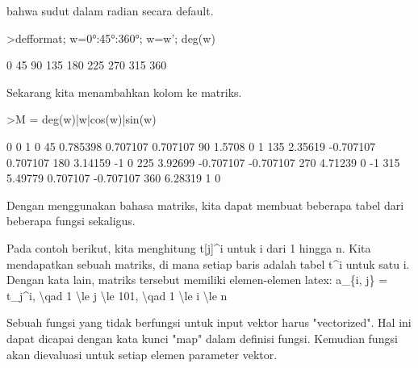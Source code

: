 \documentclass[a4paper,10pt]{article}
\begin{document}
\begin{eulernotebook}
\begin{eulercomment}
\begin{eulercomment}
\begin{eulercomment}
\begin{eulercomment}
\begin{eulercomment}
\begin{eulercomment}
\begin{eulercomment}
bahwa sudut dalam radian secara default.
\end{eulercomment}
\begin{eulerprompt}
>defformat; w=0°:45°:360°; w=w'; deg(w)
\end{eulerprompt}
\begin{euleroutput}
              0 
             45 
             90 
            135 
            180 
            225 
            270 
            315 
            360 
\end{euleroutput}
\begin{eulercomment}
Sekarang kita menambahkan kolom ke matriks.
\end{eulercomment}
\begin{eulerprompt}
>M = deg(w)|w|cos(w)|sin(w)
\end{eulerprompt}
\begin{euleroutput}
              0             0             1             0 
             45      0.785398      0.707107      0.707107 
             90        1.5708             0             1 
            135       2.35619     -0.707107      0.707107 
            180       3.14159            -1             0 
            225       3.92699     -0.707107     -0.707107 
            270       4.71239             0            -1 
            315       5.49779      0.707107     -0.707107 
            360       6.28319             1             0 
\end{euleroutput}
\begin{eulercomment}
Dengan menggunakan bahasa matriks, kita dapat membuat beberapa tabel
dari beberapa fungsi sekaligus.

Pada contoh berikut, kita menghitung t[j]\textasciicircum{}i untuk i dari 1 hingga n.
Kita mendapatkan sebuah matriks, di mana setiap baris adalah tabel t\textasciicircum{}i
untuk satu i. Dengan kata lain, matriks tersebut memiliki
elemen-elemen latex: a\_\{i, j\} = t\_j\textasciicircum{}i, \textbackslash{}qad 1 \textbackslash{}le j \textbackslash{}le 101, \textbackslash{}qad 1
\textbackslash{}le i \textbackslash{}le n

Sebuah fungsi yang tidak berfungsi untuk input vektor harus
"vectorized". Hal ini dapat dicapai dengan kata kunci "map" dalam
definisi fungsi. Kemudian fungsi akan dievaluasi untuk setiap elemen
parameter vektor.


\end{eulercomment}
\end{eulercomment}
\end{eulercomment}
\end{eulercomment}
\end{eulercomment}
\end{eulercomment}
\end{eulercomment}
\end{eulernotebook}
\end{document}
